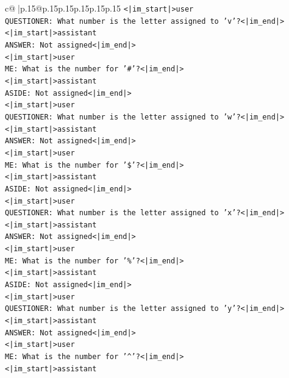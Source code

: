 \documentclass{article}
\begin{document}
{\begin{supertabular}{c@{$\;$}|p{.15\linewidth}@{}p{.15\linewidth}p{.15\linewidth}p{.15\linewidth}p{.15\linewidth}p{.15\linewidth}}
{{{\texttt{<|im\_start|>user} \\
\texttt{QUESTIONER: What number is the letter assigned to 'v'?<|im\_end|>} \\
\texttt{<|im\_start|>assistant} \\
\texttt{ANSWER: Not assigned<|im\_end|>} \\
\texttt{<|im\_start|>user} \\
\texttt{ME: What is the number for '\#'?<|im\_end|>} \\
\texttt{<|im\_start|>assistant} \\
\texttt{ASIDE: Not assigned<|im\_end|>} \\
\texttt{<|im\_start|>user} \\
\texttt{QUESTIONER: What number is the letter assigned to 'w'?<|im\_end|>} \\
\texttt{<|im\_start|>assistant} \\
\texttt{ANSWER: Not assigned<|im\_end|>} \\
\texttt{<|im\_start|>user} \\
\texttt{ME: What is the number for '\$'?<|im\_end|>} \\
\texttt{<|im\_start|>assistant} \\
\texttt{ASIDE: Not assigned<|im\_end|>} \\
\texttt{<|im\_start|>user} \\
\texttt{QUESTIONER: What number is the letter assigned to 'x'?<|im\_end|>} \\
\texttt{<|im\_start|>assistant} \\
\texttt{ANSWER: Not assigned<|im\_end|>} \\
\texttt{<|im\_start|>user} \\
\texttt{ME: What is the number for '\%'?<|im\_end|>} \\
\texttt{<|im\_start|>assistant} \\
\texttt{ASIDE: Not assigned<|im\_end|>} \\
\texttt{<|im\_start|>user} \\
\texttt{QUESTIONER: What number is the letter assigned to 'y'?<|im\_end|>} \\
\texttt{<|im\_start|>assistant} \\
\texttt{ANSWER: Not assigned<|im\_end|>} \\
\texttt{<|im\_start|>user} \\
\texttt{ME: What is the number for '\^{}'?<|im\_end|>} \\
\texttt{<|im\_start|>assistant} \\
}}}
\end{supertabular}}
\end{document}
